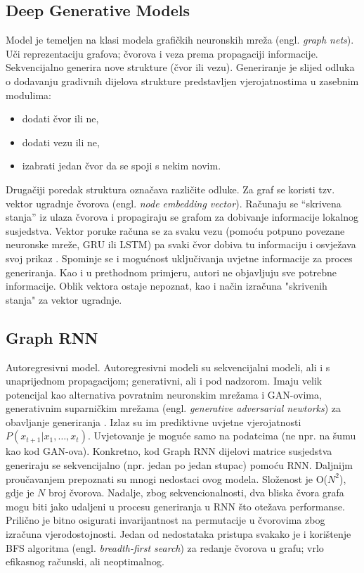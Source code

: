 \subsection{Deep Generative Models}
Model je temeljen na klasi modela grafičkih neuronskih mreža (engl. \textit{graph nets}). Uči reprezentaciju grafova; čvorova i veza prema propagaciji informacije. Sekvencijalno generira nove strukture (čvor ili vezu). Generiranje je slijed odluka o dodavanju gradivnih dijelova strukture predstavljen vjerojatnostima u zasebnim modulima:
\begin{itemize}
	\item{dodati čvor ili ne,}
	\item{dodati vezu ili ne,}
	\item{izabrati jedan čvor da se spoji s nekim novim.}
\end{itemize}
Drugačiji poredak struktura označava različite odluke.
Za graf se koristi tzv. vektor ugradnje čvorova (engl. \textit{node embedding vector}). Računaju se “skrivena stanja” iz ulaza čvorova i propagiraju se grafom za dobivanje informacije lokalnog susjedstva. Vektor poruke računa se za svaku vezu (pomoću potpuno povezane neuronske mreže, GRU ili LSTM) pa svaki čvor dobiva tu informaciju i osvježava svoj prikaz \citep{dgm}.
Spominje se i mogućnost uključivanja uvjetne informacije za proces generiranja. Kao i u prethodnom primjeru, autori ne objavljuju sve potrebne informacije. Oblik vektora ostaje nepoznat, kao i način izračuna "skrivenih stanja" za vektor ugradnje.\newline
\newline
\subsection{Graph RNN}
Autoregresivni model. Autoregresivni modeli su sekvencijalni modeli, ali i s unaprijednom propagacijom; generativni, ali i pod nadzorom. Imaju velik potencijal kao alternativa povratnim neuronskim mrežama i GAN-ovima, generativnim suparničkim mrežama (engl. \textit{generative adversarial newtorks}) za obavljanje generiranja \cite{dagm}. Izlaz su im prediktivne uvjetne vjerojatnosti $P(x_{t+1} | x_1, …, x_t)$. Uvjetovanje je moguće samo na podatcima (ne npr. na šumu kao kod GAN-ova).
Konkretno, kod Graph RNN dijelovi matrice susjedstva generiraju se sekvencijalno (npr. jedan po jedan stupac) pomoću RNN.
Daljnijm proučavanjem prepoznati su mnogi nedostaci ovog modela. Složenost je O($N^2$), gdje je $N$ broj čvorova. Nadalje, zbog sekvencionalnosti, dva bliska čvora grafa mogu biti jako udaljeni u procesu generiranja u RNN što otežava performanse. Prilično je bitno osigurati invarijantnost na permutacije u čvorovima zbog izračuna vjerodostojnosti. Jedan od nedostataka pristupa svakako je i korištenje BFS algoritma (engl. \textit{breadth-first search}) za redanje čvorova u grafu; vrlo efikasnog računski, ali neoptimalnog.\newline
\newline
